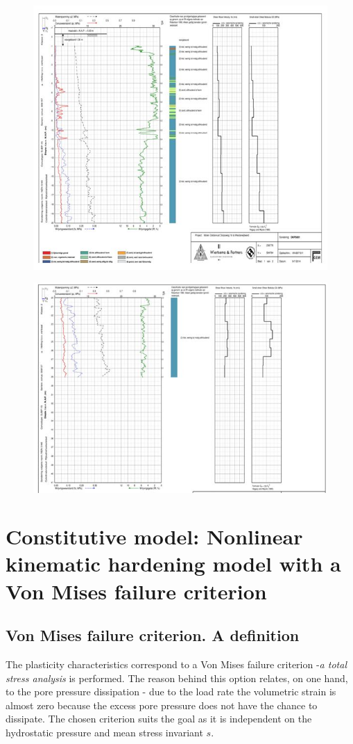 \documentclass[11pt,a4paper]{report}
\begin{document}
\begin{figure}[h!]
	\centering
	\includegraphics[width=0.85\linewidth]{"cpt"}
\end{figure}

\begin{figure}[h!]
	\centering
	\includegraphics[width=0.8\linewidth]{"cpt2"}
\end{figure}

\newpage
\chapter{Constitutive model: Nonlinear kinematic hardening model with a Von Mises failure criterion} \label{App:AppendixB}
\section{Von Mises failure criterion. A definition}
The plasticity characteristics correspond to a Von Mises failure criterion -\textit{a total stress analysis } is performed. The reason behind this option relates, on one hand, to the pore pressure dissipation - due to the load rate the volumetric strain is almost zero because the excess pore pressure does not have the chance to dissipate.  The chosen criterion suits the goal as it is independent on the hydrostatic pressure and mean stress invariant $s$.
\end{document}
